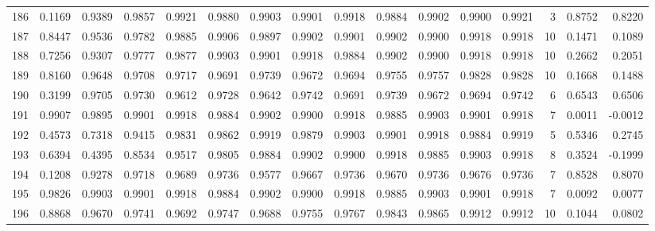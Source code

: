 \begin{tabular}{lrrrrrrrrrrrrrrr}
186 &      0.1169 &  0.9389 &  0.9857 &  0.9921 &  0.9880 &  0.9903 &  0.9901 &  0.9918 &  0.9884 &  0.9902 &   0.9900 &     0.9921 &      3 &                    0.8752 &                     0.8220 \\
187 &      0.8447 &  0.9536 &  0.9782 &  0.9885 &  0.9906 &  0.9897 &  0.9902 &  0.9901 &  0.9902 &  0.9900 &   0.9918 &     0.9918 &     10 &                    0.1471 &                     0.1089 \\
188 &      0.7256 &  0.9307 &  0.9777 &  0.9877 &  0.9903 &  0.9901 &  0.9918 &  0.9884 &  0.9902 &  0.9900 &   0.9918 &     0.9918 &     10 &                    0.2662 &                     0.2051 \\
189 &      0.8160 &  0.9648 &  0.9708 &  0.9717 &  0.9691 &  0.9739 &  0.9672 &  0.9694 &  0.9755 &  0.9757 &   0.9828 &     0.9828 &     10 &                    0.1668 &                     0.1488 \\
190 &      0.3199 &  0.9705 &  0.9730 &  0.9612 &  0.9728 &  0.9642 &  0.9742 &  0.9691 &  0.9739 &  0.9672 &   0.9694 &     0.9742 &      6 &                    0.6543 &                     0.6506 \\
191 &      0.9907 &  0.9895 &  0.9901 &  0.9918 &  0.9884 &  0.9902 &  0.9900 &  0.9918 &  0.9885 &  0.9903 &   0.9901 &     0.9918 &      7 &                    0.0011 &                    -0.0012 \\
192 &      0.4573 &  0.7318 &  0.9415 &  0.9831 &  0.9862 &  0.9919 &  0.9879 &  0.9903 &  0.9901 &  0.9918 &   0.9884 &     0.9919 &      5 &                    0.5346 &                     0.2745 \\
193 &      0.6394 &  0.4395 &  0.8534 &  0.9517 &  0.9805 &  0.9884 &  0.9902 &  0.9900 &  0.9918 &  0.9885 &   0.9903 &     0.9918 &      8 &                    0.3524 &                    -0.1999 \\
194 &      0.1208 &  0.9278 &  0.9718 &  0.9689 &  0.9736 &  0.9577 &  0.9667 &  0.9736 &  0.9670 &  0.9736 &   0.9676 &     0.9736 &      7 &                    0.8528 &                     0.8070 \\
195 &      0.9826 &  0.9903 &  0.9901 &  0.9918 &  0.9884 &  0.9902 &  0.9900 &  0.9918 &  0.9885 &  0.9903 &   0.9901 &     0.9918 &      7 &                    0.0092 &                     0.0077 \\
196 &      0.8868 &  0.9670 &  0.9741 &  0.9692 &  0.9747 &  0.9688 &  0.9755 &  0.9767 &  0.9843 &  0.9865 &   0.9912 &     0.9912 &     10 &                    0.1044 &                     0.0802 \\

\end{tabular}
